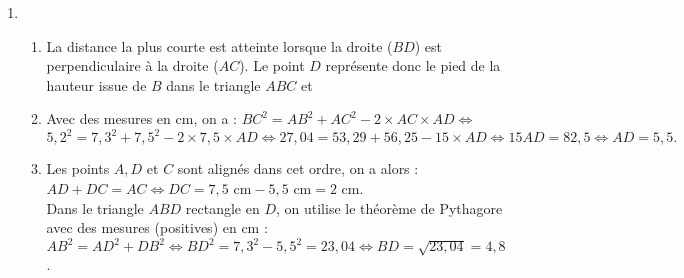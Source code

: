 \begin{enumerate}
\begin{enumerate}
          \\
      \end{enumerate}
   \item
   \begin{enumerate}
        \item La distance la plus courte est atteinte lorsque la droite ($BD$) est perpendiculaire à la droite ($AC$). Le point $D$ représente donc le pied de la hauteur issue de $B$ dans le triangle $ABC$ et  \\
        \item Avec des mesures en cm, on a : $BC^2 =AB^2+AC^2-2\times AC\times AD \iff$ \\
        $ 5,2^2 =7,3^2+7,5^2-2\times7,5\times AD \iff 27,04 =53,29+56,25-15\times AD \iff 15AD =82,5 \iff AD =5,5.$ \\
         \item Les points $A, D$ et $C$ sont alignés dans cet ordre, on a alors : \\
         $AD+DC =AC \iff DC =7,5\text{ cm}-5,5\text{ cm} =2\text{ cm}$. \\
         Dans le triangle $ABD$ rectangle en $D$, on utilise le théorème de Pythagore avec des mesures (positives) en cm :
         $AB^2 =AD^2+DB^2 \iff BD^2 =7,3^2-5,5^2 =23,04 \iff BD =\sqrt{23,04} =4,8$. \\
         \end{enumerate}
    \end{enumerate}
